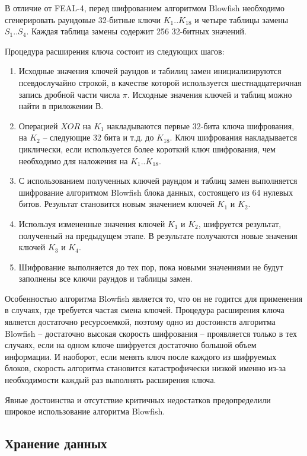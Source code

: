 В отличие от FEAL-4, перед шифрованием алгоритмом Blowfish необходимо
сгенерировать раундовые 32-битные ключи $K_1..K_{18}$ и четыре таблицы
замены $S_1..S_4$. Каждая таблица замены содержит 256 32-битных значений.

Процедура расширения ключа состоит из следующих шагов:
\begin{enumerate}
  \item Исходные значения ключей раундов и табилиц замен инициализируются
  псевдослучайно строкой, в качестве которой используется шестнадцатеричная
  запись дробной части числа $\pi$. Исходные значения ключей и таблиц можно
  найти в приложении В.
  \item Операцией $XOR$ на $K_1$ накладываются первые 32-бита ключа шифрования,
  на $K_2$ -- следующие 32 бита и т.д. до $K_{18}$. Ключ шифрования накладывается
  циклически, если используется более короткий ключ шифрования, чем необходимо
  для наложения на $K_1$..$K_{18}$.
  \item С использованием полученных ключей раундом и таблиц замен выполняется
  шифрование алгоритмом Blowfish блока данных, состоящего из 64 нулевых битов.
  Результат становится новым значением ключей $K_1$ и $K_2$.
  \item Используя измененные значения ключей $K_1$ и $K_2$, шифруется результат,
  полученный на предыдущем этапе. В результате получаются новые значения ключей
  $K_3$ и $K_4$.
  \item Шифрование выполняется до тех пор, пока новыми значениями не будут
  заполнены все ключи раундов и таблицы замен.
\end{enumerate}

Особенностью алгоритма Blowfish является то, что он не годится
для применения в случаях, где требуется частая смена ключей. Процедура
расширения ключа является достаточно ресурсоемкой, поэтому одно из достоинств
алгоритма Blowfish -- достаточно высокая скорость шифрования -- проявляется
только в тех случаях, если на одном ключе шифруется достаточно большой объем
информации. И наоборот, если менять ключ после каждого из шифруемых блоков,
скорость алгоритма становится катастрофически низкой именно из-за необходимости
каждый раз выполнять расширения ключа.

Явные достоинства и отсутствие критичных недостатков предопределили
широкое использование алгоритма Blowfish.

\subsection{Хранение данных}

